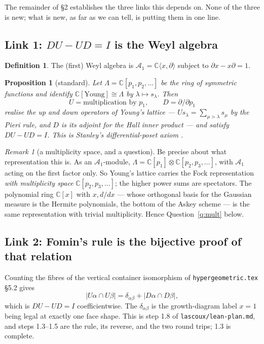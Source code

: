 \documentclass[11pt,a4paper]{article}
\newtheorem{proposition}[theorem]{Proposition}
\theoremstyle{definition}
\newtheorem{definition}[theorem]{Definition}
\theoremstyle{remark}
\newtheorem{remark}[theorem]{Remark}
\newcommand{\CC}{\mathbb{C}}
\newcommand{\Lam}{\Lambda}
\newcommand{\Weyl}{\mathcal{A}_1}
\newcommand{\norm}[1]{\lvert #1 \rvert}
\begin{document}
The remainder of \S2 establishes the three links this depends on. None of the three is
new; what is new, as far as we can tell, is putting them in one line.

\subsection{Link 1: $DU - UD = I$ is the Weyl algebra}

\begin{definition}\label{def:weyl}
The (first) Weyl algebra is $\Weyl = \CC\langle x, \partial\rangle$ subject to
$\partial x - x\partial = 1$.
\end{definition}

\begin{proposition}[standard]\label{prop:young-weyl}
Let $\Lam = \CC[p_1,p_2,\dots]$ be the ring of symmetric functions and identify
$\CC[\text{Young}] \cong \Lam$ by $\lambda \mapsto s_\lambda$. Then
\[
  U = \text{multiplication by } p_1, \qquad D = \partial/\partial p_1
\]
realise the up and down operators of Young's lattice --- $U s_\lambda = \sum_{\mu \gtrdot
\lambda} s_\mu$ by the Pieri rule, and $D$ is its adjoint for the Hall inner product
--- and satisfy $DU - UD = I$. This is Stanley's differential-poset axiom \cite{Stanley88}.
\end{proposition}

\begin{remark}[a multiplicity space, and a question]\label{rem:mult}
Be precise about what representation this is. As an $\Weyl$-module,
$\Lam = \CC[p_1]\otimes\CC[p_2,p_3,\dots]$, with $\Weyl$ acting on the first factor
only. So Young's lattice carries the Fock representation \emph{with multiplicity
space} $\CC[p_2,p_3,\dots]$; the higher power sums are spectators. The polynomial ring
$\CC[x]$ with $x, d/dx$ --- whose orthogonal basis for the Gaussian measure is the
Hermite polynomials, the bottom of the Askey scheme --- is the same representation with
trivial multiplicity. Hence Question~\ref{q:mult} below.
\end{remark}

\subsection{Link 2: Fomin's rule is the bijective proof of that relation}

Counting the fibres of the vertical container isomorphism of
\texttt{hypergeometric.tex} \S5.2 gives
\[
  \norm{U\alpha \cap U\beta} = \delta_{\alpha\beta} + \norm{D\alpha \cap D\beta},
\]
which is $DU - UD = I$ coefficientwise. The $\delta_{\alpha\beta}$ is the growth-diagram
label $x = 1$ being legal at exactly one face shape. This is step 1.8 of
\texttt{lascoux/lean-plan.md}, and steps 1.3--1.5 are the rule, its reverse, and the
two round trips; 1.3 is complete.
\end{document}
